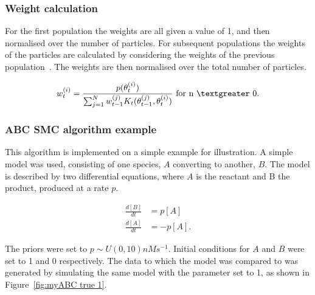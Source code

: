 \subsubsection{Weight calculation}
\label{sec:weight}
For the first population the weights are all given a value of 1, and then normalised over the number of particles. For subsequent populations the weights of the particles are calculated by considering the weights of the previous population~\autocite{Toni:2009tr}. The weights are then normalised over the total number of particles. 


\begin{align}
w_{t}^{(i)} = \frac{p(\theta_{t}^{(i)})}{\sum_{j=1}^N w_{t-1}^{(j)} K_{t}(\theta_{t-1}^{(j)}, \theta_{t}^{(i)})} \text{ for n $\textgreater$  0}.
\end{align}
	
	
\subsubsection{ABC SMC algorithm example}	
This algorithm is implemented on a simple example for illustration. A simple model was used, consisting of one species, $A$ converting to another, $B$. The model is described by two differential equations, where $A$ is the reactant and B the product, produced at a rate $p$. 

\begin{align}
\frac{d[B]}{dt} &= p[A] \\ 
\frac{d[A]}{dt} &= -p[A]. 
\end{align}

\noindent The priors were set to $p \sim U(0, 10)nM s^{-1}$. Initial conditions for $A$ and $B$ were set to 1 and 0 respectively. The data to which the model was compared to was generated by simulating the same model with the parameter set to 1, as shown in Figure~\ref{fig:myABC true 1}.

